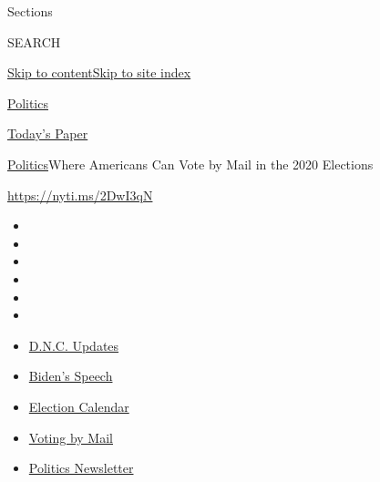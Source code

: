 Sections

SEARCH

\protect\hyperlink{site-content}{Skip to
content}\protect\hyperlink{site-index}{Skip to site index}

\href{https://www.nytimes3xbfgragh.onion/section/politics}{Politics}

\href{https://myaccount.nytimes3xbfgragh.onion/auth/login?response_type=cookie\&client_id=vi}{}

\href{https://www.nytimes3xbfgragh.onion/section/todayspaper}{Today's
Paper}

\href{/section/politics}{Politics}\textbar{}Where Americans Can Vote by
Mail in the 2020 Elections

\url{https://nyti.ms/2DwI3qN}

\begin{itemize}
\item
\item
\item
\item
\item
\item
\end{itemize}

\begin{itemize}
\item
  \href{https://www.nytimes3xbfgragh.onion/live/2020/08/20/us/dnc-convention-election?action=click\&pgtype=Article\&state=default\&region=TOP_BANNER\&context=storylines_menu}{D.N.C.
  Updates}
\item
  \href{https://www.nytimes3xbfgragh.onion/2020/08/20/us/politics/biden-presidential-nomination-dnc.html?action=click\&pgtype=Article\&state=default\&region=TOP_BANNER\&context=storylines_menu}{Biden's
  Speech}
\item
  \href{https://www.nytimes3xbfgragh.onion/interactive/2019/us/elections/2020-presidential-election-calendar.html?action=click\&pgtype=Article\&state=default\&region=TOP_BANNER\&context=storylines_menu}{Election
  Calendar}
\item
  \href{https://www.nytimes3xbfgragh.onion/interactive/2020/08/11/us/politics/vote-by-mail-us-states.html?action=click\&pgtype=Article\&state=default\&region=TOP_BANNER\&context=storylines_menu}{Voting
  by Mail}
\item
  \href{https://www.nytimes3xbfgragh.onion/newsletters/politics?action=click\&pgtype=Article\&state=default\&region=TOP_BANNER\&context=storylines_menu}{Politics
  Newsletter}
\end{itemize}

